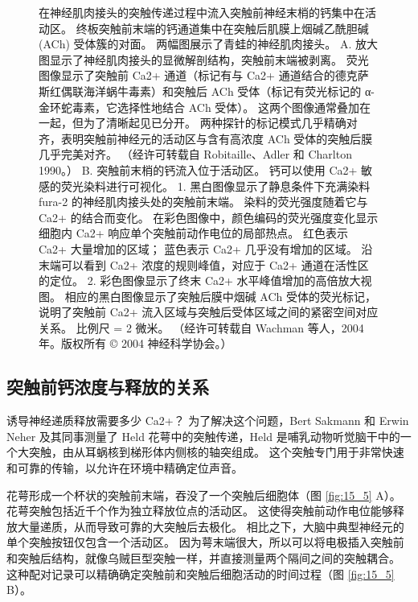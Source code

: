 \begin{figure}[htbp]
	\caption{在神经肌肉接头的突触传递过程中流入突触前神经末梢的钙集中在活动区。 终板突触前末端的钙通道集中在突触后肌膜上烟碱乙酰胆碱 (ACh) 受体簇的对面。 两幅图展示了青蛙的神经肌肉接头。 A. 放大图显示了神经肌肉接头的显微解剖结构，突触前末端被剥离。 荧光图像显示了突触前 Ca2+ 通道（标记有与 Ca2+ 通道结合的德克萨斯红偶联海洋蜗牛毒素）和突触后 ACh 受体（标记有荧光标记的 α-金环蛇毒素，它选择性地结合 ACh 受体）。 这两个图像通常叠加在一起，但为了清晰起见已分开。 两种探针的标记模式几乎精确对齐，表明突触前神经元的活动区与含有高浓度 ACh 受体的突触后膜几乎完美对齐。 （经许可转载自 Robitaille、Adler 和 Charlton 1990。） B. 突触前末梢的钙流入位于活动区。 钙可以使用 Ca2+ 敏感的荧光染料进行可视化。 1. 黑白图像显示了静息条件下充满染料 fura-2 的神经肌肉接头处的突触前末端。 染料的荧光强度随着它与 Ca2+ 的结合而变化。 在彩色图像中，颜色编码的荧光强度变化显示细胞内 Ca2+ 响应单个突触前动作电位的局部热点。 红色表示 Ca2+ 大量增加的区域； 蓝色表示 Ca2+ 几乎没有增加的区域。 沿末端可以看到 Ca2+ 浓度的规则峰值，对应于 Ca2+ 通道在活性区的定位。 2. 彩色图像显示了终末 Ca2+ 水平峰值增加的高倍放大视图。 相应的黑白图像显示了突触后膜中烟碱 ACh 受体的荧光标记，说明了突触前 Ca2+ 流入区域与突触后受体区域之间的紧密空间对应关系。 比例尺 = 2 微米。 （经许可转载自 Wachman 等人，2004 年。版权所有 © 2004 神经科学协会。）}
	\label{fig:15_4}
\end{figure}


\subsection{突触前钙浓度与释放的关系}
诱导神经递质释放需要多少 Ca2+？ 
为了解决这个问题，Bert Sakmann 和 Erwin Neher 及其同事测量了 Held 花萼中的突触传递，Held 是哺乳动物听觉脑干中的一个大突触，由从耳蜗核到梯形体内侧核的轴突组成。 
这个突触专门用于非常快速和可靠的传输，以允许在环境中精确定位声音。


花萼形成一个杯状的突触前末端，吞没了一个突触后细胞体（图 \ref{fig:15_5} A）。 
花萼突触包括近千个作为独立释放位点的活动区。 这使得突触前动作电位能够释放大量递质，从而导致可靠的大突触后去极化。 
相比之下，大脑中典型神经元的单个突触按钮仅包含一个活动区。 
因为萼末端很大，所以可以将电极插入突触前和突触后结构，就像乌贼巨型突触一样，并直接测量两个隔间之间的突触耦合。 
这种配对记录可以精确确定突触前和突触后细胞活动的时间过程（图 \ref{fig:15_5} B）。


